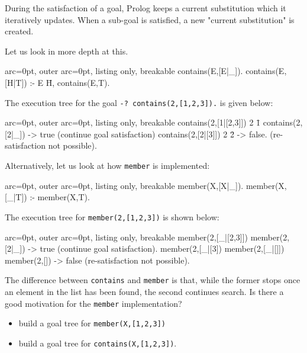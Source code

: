 During the satisfaction of a goal, Prolog keeps a current substitution which it iteratively updates. When a sub-goal is satisfied, a new "current substitution" is created.

Let us look in more depth at this.


\begin{tcblisting}{ arc=0pt, outer arc=0pt, listing only, breakable}
contains(E,[E|_]).
contains(E,[H|T]) :- E \= H, contains(E,T).

\end{tcblisting}


The execution tree for the goal \texttt{-? contains(2,[1,2,3]).} is given below:


\begin{tcblisting}{ arc=0pt, outer arc=0pt, listing only, breakable}
contains(2,[1|[2,3]])
    2 \= 1
    contains(2,[2|_]) -> true (continue goal satisfaction)
    contains(2,[2|[3]])   
       2 \= 2 -> false. (re-satisfaction not possible).

\end{tcblisting}


Alternatively, let us look at how \texttt{member} is implemented:


\begin{tcblisting}{ arc=0pt, outer arc=0pt, listing only, breakable}
member(X,[X|_]).
member(X,[_|T]) :- member(X,T).

\end{tcblisting}


The execution tree for \texttt{member(2,[1,2,3])} is shown below:

\begin{tcblisting}{ arc=0pt, outer arc=0pt, listing only, breakable}
member(2,[_|[2,3]])
   member(2,[2|_]) -> true (continue goal satisfaction).
   member(2,[_|[3])
      member(2,[_|[]])
         member(2,[]) -> false (re-satisfaction not possible).

\end{tcblisting}


The difference between \texttt{contains} and \texttt{member} is that, while the former stops once an element in the list has been found, the second continues search. Is there a good motivation for the \texttt{member} implementation?
\begin{itemize}
	\item  build a goal tree for \texttt{member(X,[1,2,3])}
	\item  build a goal tree for \texttt{contains(X,[1,2,3])}.
\end{itemize}


